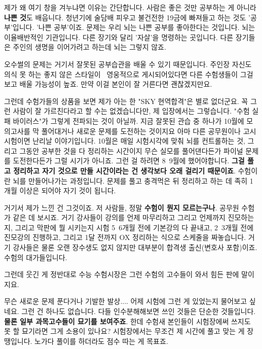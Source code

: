 제가 왜 여기 창을 겨누냐면 이유는 간단합니다.
사람은 좋은 것만 공부하는 게 아니라 \textbf{나쁜 것}도 배웁니다.
청년기에 술담배 피우고 불건전한 19금에 빠져들고 하는 것도 '공부'입니다. '나쁜 공부'이죠.
문제는 우리 뇌는 나쁜 공부를 좋아한다는 것입니다. 뇌는 이율배반적인 기관입니다.
다른 장기와 달리 '자살'을 명령하는 곳입니다. 다른 장기들은 주인의 생명을 이어가려고 하는데 뇌는 그렇지 않죠.
\vspace{5mm}

오수썰의 문제는 거기서 잘못된 공부습관을 배울 수 있기 때문입니다.
주인장 자신도 의식 못 하는 좋지 않은 스타일이  영웅적으로 게시되어있다면 다른 수험생들이 그걸 보고 배울 가능성이 높죠.
만약 이걸 본인이 잘 거른다면 괜찮겠지만요.
\vspace{5mm}

그런데 수험가들의 상품을 보면 제가 아는 한 "SKY 현역합격"은 별로 없더군요.
꼭 그런 사람이 잘 가르친다라고 할 수는 없겠습니다만, 제 입장에서는 그렇습니다. "수험 실패 바이러스"가 그렇게 전파되는 것이 아닐까.
지금 잘못된 관습 중 하나가 10월에 모의고사를 막 풀어대거나 새로운 문제를 도전하는 것이지요
아마 다른 공무원이나 고시 시험이면 난리날 이야기입니다.
10월은 매일 시험시각에 맞춰 뇌를 컨트롤하는 것, 그리고 그동안 공부한 것을 다 정리하는 시간이지
무슨 실모를 풀어댄다든가 파이널 문제를 도전한다든가 그럴 시기가 아니죠.
그런 걸 하려면 8~9월에 했어야합니다. \textbf{그걸 풀고 정리하고 자기 것으로 만들 시간이라는 건 생각보다 오래 걸리기 때문이죠}.
수험이란 뇌를 만들어나가는 과정입니다. 문제를 풀고 충격먹은 뒤 정리하고 하는 데 족히 1개월 이상은 되어야 자기 것이 됩니다.
\vspace{5mm}

거기서 제가 느낀 건 그것이죠. 저 사람들, 정말 \textbf{수험이 뭔지 모르는구나}.
공무원 수험가 같은 데 보시죠. 거기 강사들이 강의를 언제 마무리하고 그리고 언제까지 진모하는지, 그리고 막판에 뭘 시키는지
시험 5~6개월 전에 기본강의 다 끝내고, 2~3개월 전에 진모강의 진행하고, 그리고 1달 전까지 OX 정리하는 식으로 스케줄을 짜놓습니다.
거기 강사들은 물론 오랜 장수생도 없지 않지만 대부분이 합격생 출신(변호사 포함)이죠. 수험의 대가들입니다.
\vspace{5mm}

그런데 웃긴 게 정반대로 수능 수험시장은 그런 수험의 고수들이 와서 힘든 판에 말이지요.
\vspace{5mm}

무슨 새로운 문제 푼다거나 기발한 발상.... 어제 시험에 그런 게 있었는지 물어보고 싶네요.
그런 건 하나도 없습니다. 다들 인수분해해보면 쓰인 것들은 단순한 것들입니다.
\textbf{물론 일부 과목고수들이 묘기를 보여주죠}. 한데 수험새 본인들이 시험장에써 쓰지도 못 할 묘기라면 그게 소용이 있나요?
시험장에서는 무조건 제 시간에 풀고 맞는 게 장땡입니다. 노가다 풀이를 하더라도 점수 따는 게 목표죠.
\vspace{5mm}

